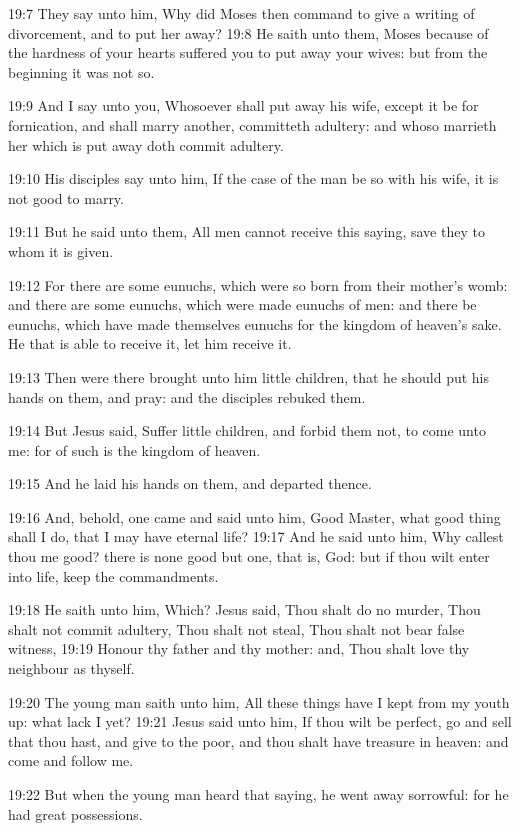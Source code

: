 19:7 They say unto him, Why did Moses then command to give a writing
of divorcement, and to put her away?  19:8 He saith unto them, Moses
because of the hardness of your hearts suffered you to put away your
wives: but from the beginning it was not so.

19:9 And I say unto you, Whosoever shall put away his wife, except it
be for fornication, and shall marry another, committeth adultery: and
whoso marrieth her which is put away doth commit adultery.

19:10 His disciples say unto him, If the case of the man be so with
his wife, it is not good to marry.

19:11 But he said unto them, All men cannot receive this saying, save
they to whom it is given.

19:12 For there are some eunuchs, which were so born from their
mother's womb: and there are some eunuchs, which were made eunuchs of
men: and there be eunuchs, which have made themselves eunuchs for the
kingdom of heaven's sake. He that is able to receive it, let him
receive it.

19:13 Then were there brought unto him little children, that he should
put his hands on them, and pray: and the disciples rebuked them.

19:14 But Jesus said, Suffer little children, and forbid them not, to
come unto me: for of such is the kingdom of heaven.

19:15 And he laid his hands on them, and departed thence.

19:16 And, behold, one came and said unto him, Good Master, what good
thing shall I do, that I may have eternal life?  19:17 And he said
unto him, Why callest thou me good? there is none good but one, that
is, God: but if thou wilt enter into life, keep the commandments.

19:18 He saith unto him, Which? Jesus said, Thou shalt do no murder,
Thou shalt not commit adultery, Thou shalt not steal, Thou shalt not
bear false witness, 19:19 Honour thy father and thy mother: and, Thou
shalt love thy neighbour as thyself.

19:20 The young man saith unto him, All these things have I kept from
my youth up: what lack I yet?  19:21 Jesus said unto him, If thou wilt
be perfect, go and sell that thou hast, and give to the poor, and thou
shalt have treasure in heaven: and come and follow me.

19:22 But when the young man heard that saying, he went away
sorrowful: for he had great possessions.

